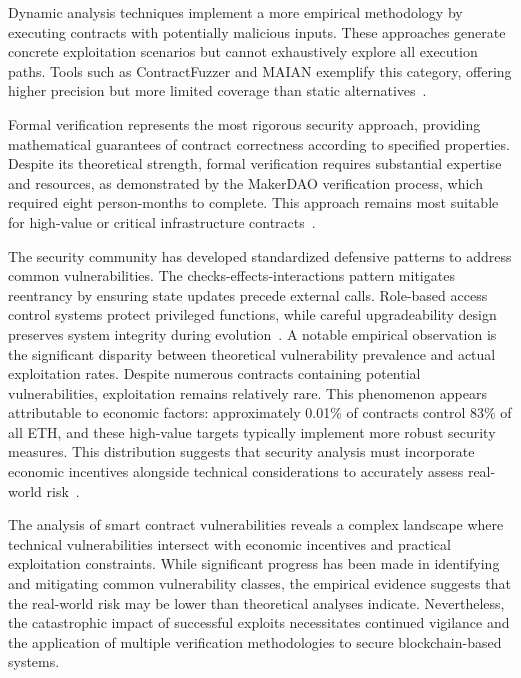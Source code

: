 Dynamic analysis techniques implement a more empirical methodology by executing contracts with potentially malicious inputs. These approaches generate concrete exploitation scenarios but cannot exhaustively explore all execution paths. Tools such as ContractFuzzer and MAIAN exemplify this category, offering higher precision but more limited coverage than static alternatives~\cite{praitheeshan2019systematic}.

Formal verification represents the most rigorous security approach, providing mathematical guarantees of contract correctness according to specified properties. Despite its theoretical strength, formal verification requires substantial expertise and resources, as demonstrated by the MakerDAO verification process, which required eight person-months to complete. This approach remains most suitable for high-value or critical infrastructure contracts~\cite{praitheeshan2019systematic}.

The security community has developed standardized defensive patterns to address common vulnerabilities. The checks-effects-interactions pattern mitigates reentrancy by ensuring state updates precede external calls. Role-based access control systems protect privileged functions, while careful upgradeability design preserves system integrity during evolution~\cite{perez2021analysis, praitheeshan2019systematic}.
A notable empirical observation is the significant disparity between theoretical vulnerability prevalence and actual exploitation rates. Despite numerous contracts containing potential vulnerabilities, exploitation remains relatively rare. This phenomenon appears attributable to economic factors: approximately 0.01\% of contracts control 83\% of all ETH, and these high-value targets typically implement more robust security measures. This distribution suggests that security analysis must incorporate economic incentives alongside technical considerations to accurately assess real-world risk~\cite{perez2021analysis, perez2020analysis}.

The analysis of smart contract vulnerabilities reveals a complex landscape where technical vulnerabilities intersect with economic incentives and practical exploitation constraints. While significant progress has been made in identifying and mitigating common vulnerability classes, the empirical evidence suggests that the real-world risk may be lower than theoretical analyses indicate. Nevertheless, the catastrophic impact of successful exploits necessitates continued vigilance and the application of multiple verification methodologies to secure blockchain-based systems.



